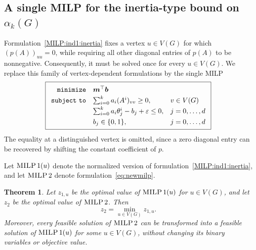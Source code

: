 \documentclass[10pt]{article}
\newtheorem{theorem}{Theorem}[section]
\def\vecb{{\mbox{\boldmath \(b\)}}}
\def\vecm{{\mbox{\boldmath \(m\)}}}
\begin{document}
\subsection{A single MILP for the inertia-type bound on \(\alpha_k(G)\)}
\label{subsec:single-alpha-milp}

Formulation~\eqref{MILP:ind1:inertia} fixes a vertex \(u\in V(G)\) for which
\((p(A))_{uu}=0\), while requiring all other diagonal entries of \(p(A)\) to
be nonnegative. Consequently, it must be solved once for every \(u\in V(G)\).
We replace this family of vertex-dependent formulations by the single MILP
\begin{equation}
\boxed{\def\arraystretch{1.3}
\begin{array}{rll}
{\tt minimize} & \vecm^\top \vecb &\\
{\tt subject\ to} & \sum_{i=0}^{k} a_i (A^i)_{vv} \geq 0, &v\in V(G)\\
 & \sum_{i=0}^{k} a_i \theta_j^i - b_j + \varepsilon \leq 0, &j=0,\ldots,d\\
 & b_j\in\{0,1\}, &j=0,\ldots,d
\end{array}}
\label{eq:newmilp}
\end{equation}
The equality at a distinguished vertex is omitted, since a zero diagonal
entry can be recovered by shifting the constant coefficient of \(p\).

Let \(\textsc{MILP}\,1(u)\) denote the normalized version of
formulation~\eqref{MILP:ind1:inertia}, and let \(\textsc{MILP}\,2\) denote
formulation~\eqref{eq:newmilp}.

\begin{theorem}
\label{thm:milp-equivalence}
Let \(z_{1,u}\) be the optimal value of \(\textsc{MILP}\,1(u)\) for
\(u\in V(G)\), and let \(z_2\) be the optimal value of
\(\textsc{MILP}\,2\). Then
\[
    z_2=\min_{u\in V(G)}z_{1,u}.
\]
Moreover, every feasible solution of \(\textsc{MILP}\,2\) can be transformed
into a feasible solution of \(\textsc{MILP}\,1(u)\) for some \(u\in V(G)\),
without changing its binary variables or objective value.
\end{theorem}
\end{document}
